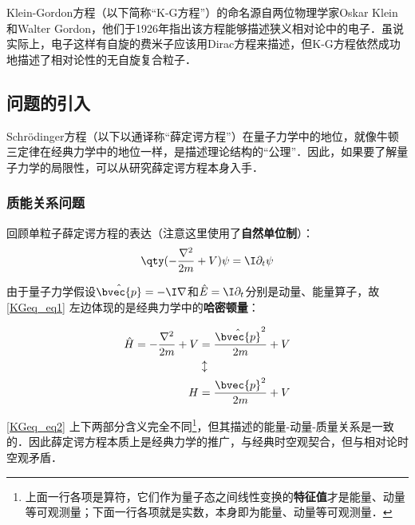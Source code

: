 


Klein-Gordon方程（以下简称“K-G方程”）的命名源自两位物理学家Oskar Klein和Walter Gordon，他们于1926年指出该方程能够描述狭义相对论中的电子．虽说实际上，电子这样有自旋的费米子应该用Dirac方程来描述，但K-G方程依然成功地描述了相对论性的无自旋复合粒子．


\subsection{问题的引入}

Schrödinger方程（以下以通译称“薛定谔方程”）在量子力学中的地位，就像牛顿三定律在经典力学中的地位一样，是描述理论结构的“公理”．因此，如果要了解量子力学的局限性，可以从研究薛定谔方程本身入手．

\subsubsection{质能关系问题}

回顾单粒子薛定谔方程的表达（注意这里使用了\textbf{自然单位制}）：
\begin{equation}\label{KGeq_eq1}
\qty(-\frac{\nabla^2}{2m}+V)\psi = \I \partial_t \psi
\end{equation}

由于量子力学假设$\hat{\bvec{p}}=-\I\nabla$和$\hat{E}=\I\partial_t$分别是动量、能量算子，故\autoref{KGeq_eq1} 左边体现的是经典力学中的\textbf{哈密顿量}：

\begin{equation}\label{KGeq_eq2}
\begin{aligned}
\hat{H}=-\frac{\nabla^2}{2m}+V &= \frac{\hat{\bvec{p}}^2}{2m}+V \\
&\updownarrow\\
H &= \frac{\bvec{p}^2}{2m}+V
\end{aligned}
\end{equation}

\autoref{KGeq_eq2} 上下两部分含义完全不同\footnote{上面一行各项是算符，它们作为量子态之间线性变换的\textbf{特征值}才是能量、动量等可观测量；下面一行各项就是实数，本身即为能量、动量等可观测量．}，但其描述的能量-动量-质量关系是一致的．因此薛定谔方程本质上是经典力学的推广，与经典时空观契合，但与相对论时空观矛盾．

